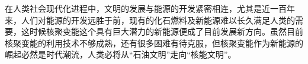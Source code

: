 \begin{cabstract}
	在人类社会现代化进程中，文明的发展与能源的开发紧密相连，尤其是近一百年来，人们对能源的开发远胜于前，现有的化石燃料及新能源难以长久满足人类的需要，这时候核聚变能这个具有巨大潜力的新能源便成了目前发展新方向。虽然目前核聚变能的利用技术不够成熟，还有很多困难有待克服，但核聚变能作为新能源的崛起必然是时代潮流，人类必将从“石油文明”走向“核能文明”。
\end{cabstract}

